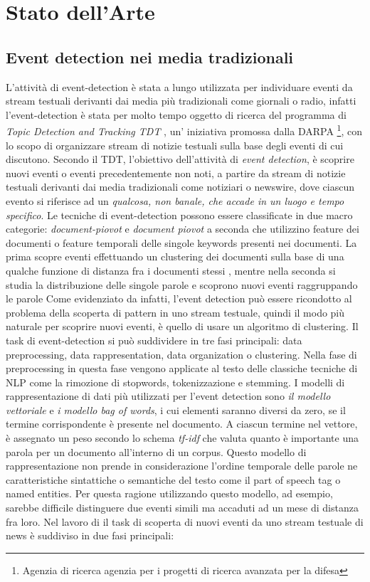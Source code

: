 \documentclass[a4paper,12pt]{report}
\begin{document}

\chapter{Stato dell'Arte} 
\section{Event detection nei media tradizionali}
L'attività di event-detection è stata a lungo utilizzata per individuare eventi da stream testuali derivanti dai media più tradizionali come giornali o radio, infatti l'event-detection è stata per molto tempo oggetto di ricerca del programma di \emph{Topic Detection and Tracking TDT} \parencite{All02}, un' iniziativa	promossa dalla DARPA \footnote{Agenzia di ricerca agenzia per i progetti di ricerca avanzata per la difesa}, con lo scopo di organizzare stream di notizie testuali sulla base degli eventi di cui discutono. Secondo il TDT, l'obiettivo dell'attività di \emph{event detection}, è scoprire nuovi  eventi o eventi precedentemente non noti, a partire da stream di notizie testuali derivanti dai media tradizionali come notiziari o newswire, dove ciascun evento si riferisce ad un \emph{qualcosa, non banale, che accade in un luogo e tempo specifico}. Le tecniche di event-detection possono essere classificate in due macro categorie: \emph{document-piovot} e \emph{document piovot} a seconda che utilizzino feature dei documenti o feature temporali delle singole keywords presenti nei documenti. 
La prima scopre eventi effettuando un clustering dei documenti sulla base di una qualche funzione di distanza fra i documenti stessi \cite{Yang:1998:SRO:290941.290953}, mentre nella seconda si studia la distribuzione delle singole parole e scoprono nuovi eventi raggruppando le parole \cite{Kleinberg:2002:BHS:775047.775061} 
Come evidenziato da \cite{Yang:1998:SRO:290941.290953} infatti, l'event detection può essere ricondotto al problema della scoperta di pattern in uno stream testuale, quindi il modo più naturale per scoprire nuovi eventi, è quello di usare un algoritmo di clustering. Il task di event-detection si può suddividere in tre fasi principali: data preprocessing, data rappresentation, data organization o clustering. Nella fase di preprocessing in questa fase vengono applicate al testo delle classiche tecniche di NLP come la rimozione di stopwords, tokenizzazione e stemming.
I modelli di rappresentazione di dati più utilizzati per l'event detection sono  \emph{il modello vettoriale} e  \emph{i modello bag of words}, i cui elementi saranno diversi da zero, se il termine corrispondente è presente nel documento. A ciascun termine nel vettore, è assegnato un peso secondo lo schema \emph{tf-idf}\cite{Salton:1989:ATP:77013} che valuta quanto è importante una parola per un documento all'interno di un corpus. Questo modello di rappresentazione non prende in considerazione l'ordine temporale delle parole ne caratteristiche sintattiche o semantiche del testo come il part of speech tag o named entities. Per questa ragione utilizzando questo modello, ad esempio, sarebbe difficile distinguere due eventi simili ma accaduti ad un mese di distanza fra loro. Nel lavoro di \cite{Yang:1998:SRO:290941.290953} il task di scoperta di nuovi eventi da uno stream testuale di news è suddiviso in due fasi principali:
\end{document}
